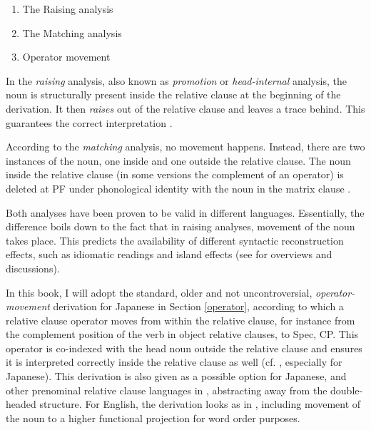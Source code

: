 \begin{enumerate}
\item The Raising analysis
\item The Matching analysis
\item Operator movement
\end{enumerate}

In the \textit{raising} analysis, also known as \textit{promotion} or \textit{head-internal} analysis, the noun is structurally present inside the relative clause at the beginning of the derivation. It then \textit{raises} out of the relative clause and leaves a trace behind. This guarantees the correct interpretation \citep{schachter:1973:focus, vergnaud:1974:french, vergnaud:1985:dep, kayne:1994:anti, bianchi:1999:consequences, bhatt:2002:raising}.

According to the \textit{matching} analysis, no movement happens. Instead, there are two instances of the noun, one inside and one outside the relative clause. The noun inside the relative clause (in some versions the complement of an operator) is deleted at PF under phonological identity with the noun in the matrix clause \citep{lees:1961:constituent, chomsky:1965:aspects, schachter:1973:focus, sauerland:1998:the, sauerland:2003:a, salzmann:2017:reconstruction, salzmann:2019:new}.

Both analyses have been proven to be valid in different languages. Essentially, the difference boils down to the fact that in raising analyses, movement of the noun takes place. This predicts the availability of different syntactic reconstruction effects, such as idiomatic readings and island effects (see \citealt{cinque:2008:more, cinque:2020:relcl, salzmann:2017:reconstruction, salzmann:2019:new} for overviews and discussions).

In this book, I will adopt the standard, older and not uncontroversial, \textit{operator-movement} derivation for Japanese in Section \ref{operator}, according to which a relative clause operator moves from within the relative clause, for instance from the complement position of the verb in object relative clauses, to Spec, CP. This operator is co-indexed with the head noun outside the relative clause and ensures it is interpreted correctly inside the relative clause as well (cf. \citealt{chomsky:1977:on}, especially \citealt{miyamoto:2017:RC} for Japanese). This derivation is also given as a possible option for Japanese, and other prenominal relative clause languages in \citet[81]{cinque:2020:relcl}, abstracting away from the double-headed structure. For English, the derivation looks as in , including movement of the noun to a higher functional projection for word order purposes.

